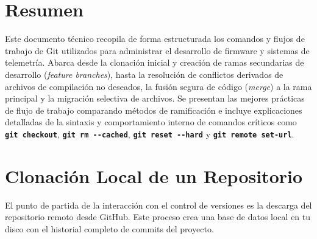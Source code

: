 \documentclass[
10pt, %
a4paper, %
oneside, %
headinclude,footinclude, %
BCOR5mm, %
]{scrartcl}
\begin{document}
\setcounter{tocdepth}{3} %

\section*{Resumen}
Este documento técnico recopila de forma estructurada los comandos y flujos de trabajo de Git utilizados para administrar el desarrollo de firmware y sistemas de telemetría. Abarca desde la clonación inicial y creación de ramas secundarias de desarrollo (\textit{feature branches}), hasta la resolución de conflictos derivados de archivos de compilación no deseados, la fusión segura de código (\textit{merge}) a la rama principal y la migración selectiva de archivos. Se presentan las mejores prácticas de flujo de trabajo comparando métodos de ramificación e incluye explicaciones detalladas de la sintaxis y comportamiento interno de comandos críticos como \textbf{\texttt{git checkout}}, \textbf{\texttt{git rm -{}-cached}}, \textbf{\texttt{git reset -{}-hard}} y \textbf{\texttt{git remote set-url}}.
\newpage %

\tableofcontents %

\newpage

\section{Clonación Local de un Repositorio}

El punto de partida de la interacción con el control de versiones es la descarga del repositorio remoto desde GitHub. Este proceso crea una base de datos local en tu disco con el historial completo de commits del proyecto.
\end{document}
